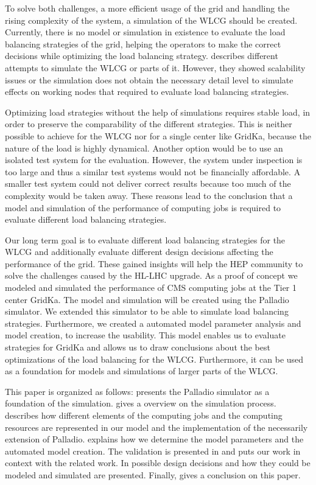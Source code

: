 \documentclass[runningheads,a4paper]{llncs}[2017/09/04]
\begin{document}
To solve both challenges, a more efficient usage of the grid and handling the rising complexity of the system, a simulation of the WLCG should be created.
Currently, there is no model or simulation in existence to evaluate the load balancing strategies of the grid, helping the operators to make the correct decisions while optimizing the load balancing strategy.
 describes different attempts to simulate the WLCG or parts of it. However, they showed scalability issues or the simulation does not obtain the necessary detail level to simulate effects on working nodes that required to evaluate load balancing strategies.

Optimizing load strategies without the help of simulations requires stable load, in order to preserve the comparability of the different strategies. This is neither possible to achieve for the WLCG nor for a single center like GridKa, because the nature of the load is highly dynamical. Another option would be to use an isolated test system for the evaluation. However, the system under inspection is too large and thus a similar test systems would not be financially affordable. A smaller test system could not deliver correct results because too much of the complexity would be taken away.
These reasons lead to the conclusion that a model and simulation of the performance of computing jobs is required to evaluate different load balancing strategies.

Our long term goal is to evaluate different load balancing strategies for the WLCG and additionally evaluate different design decisions affecting the performance of the grid. These gained insights will help the HEP community to solve the challenges caused by the HL-LHC upgrade.
As a proof of concept we modeled and simulated the performance of CMS computing jobs at the Tier 1 center GridKa.
The model and simulation will be created using the Palladio simulator. We extended this simulator to be able to simulate load balancing strategies. Furthermore, we created a automated model parameter analysis and model creation, to increase the usability.
This model enables us to evaluate strategies for GridKa and allows us to draw conclusions about the best optimizations of the load balancing for the WLCG. Furthermore, it can be used as a foundation for models and simulations of larger parts of the WLCG.


This paper is organized as follows:  presents the Palladio simulator as a foundation of the simulation.  gives a overview on the simulation process. describes how different elements of the computing jobs and the computing resources are represented in our model and the implementation of the necessarily extension of Palladio.  explains how we determine the model parameters and the automated model creation. The validation is presented in  and  puts our work in context with the related work. In  possible design decisions and how they could be modeled and simulated are presented. Finally,  gives a conclusion on this paper.
\end{document}
